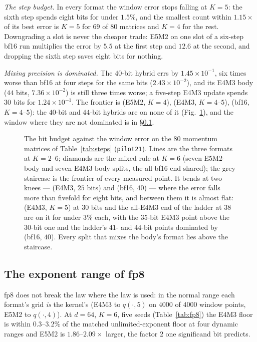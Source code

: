 \emph{The step budget.}  In every format the window error stops falling at $K=5$: the
sixth step spends eight bits for under $1.5\%$, and the smallest count within $1.15\times$
of its best error is $K=5$ for $69$ of $80$ matrices and $K=4$ for the rest.  Downgrading a slot is never the
cheaper trade: E5M2 on one slot of a six-step bf16 run multiplies the error by $5.5$ at
the first step and $12.6$ at the second, and dropping the sixth step saves eight bits for
nothing.

\emph{Mixing precision is dominated.}  The $40$-bit hybrid errs by $1.45\times10^{-1}$,
six times worse than bf16 at four steps for the same bits ($2.43\times10^{-2}$), and its
E4M3 body ($44$ bits, $7.36\times10^{-2}$) is still three times worse; a five-step E4M3
update spends $30$ bits for $1.24\times10^{-1}$.  The frontier is (E5M2, $K=4$), (E4M3,
$K=4$--$5$), (bf16, $K=4$--$5$): the $40$-bit and $44$-bit hybrids are on none of it
(Fig.~\ref{fig:pareto}), and
the window where they are not dominated is in \S\ref{sec:fp8}.

\begin{figure}[t]
\centering

\caption{The bit budget against the window error on the 80 momentum matrices of
Table~\ref{tab:steps} (\texttt{pilot21}).  Lines are the three formats at $K=2$--$6$;
diamonds are the mixed rule at $K=6$ (seven E5M2-body and seven E4M3-body splits, the
all-bf16 end shared); the grey staircase is the frontier of every measured point.  It bends
at two knees --- (E4M3, $25$ bits) and (bf16, $40$) --- where the error falls more than
fivefold for eight bits, and between them it is almost flat: (E4M3, $K=5$) at $30$ bits and
the all-E4M3 end of the ladder at $38$ are on it for under $3\%$ each, with the $35$-bit
E4M3 point above the $30$-bit one and the ladder's $41$- and $44$-bit points dominated by
(bf16, $40$).  Every split that mixes the body's format lies above the staircase.}
\label{fig:pareto}
\end{figure}

\subsection{The exponent range of fp8}
\label{sec:fp8}

fp8 does not break the law where the law is used: in the normal range each format's grid
\emph{is} the kernel's (E4M3 to $q(\cdot,5)$ on $4000$ of $4000$ window points, E5M2 to
$q(\cdot,4)$).  At $d=64$, $K=6$, five seeds (Table~\ref{tab:fp8}) the
E4M3 floor is within $0.3$--$3.2\%$ of the matched unlimited-exponent floor at four
dynamic ranges and E5M2 is $1.86$--$2.09\times$ larger, the factor $2$ one significand
bit predicts.

